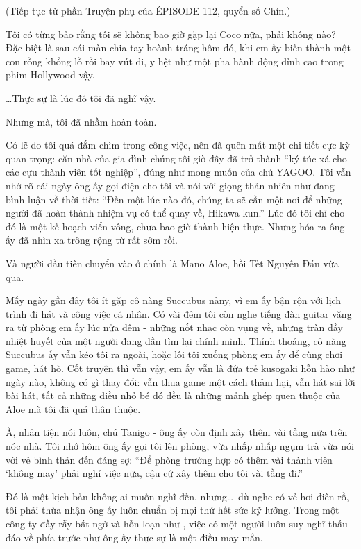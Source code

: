 \documentclass[../main.tex]{subfiles}
\begin{document}
\begin{center}
  (Tiếp tục từ phần {\abv Truyện phụ} của {\flaregothic ÉPISODE 112}, quyển số Chín.)
\end{center}


Tôi có từng bảo rằng tôi sẽ không bao giờ gặp lại Coco nữa, phải không nào? Đặc biệt là sau cái màn chia tay hoành tráng hôm đó, khi em ấy biến thành một con rồng khổng lồ rồi bay vút đi, y hệt như một pha hành động đỉnh cao trong phim Hollywood vậy.

\dots Thực sự là lúc đó tôi đã nghĩ vậy.

Nhưng mà, tôi đã nhầm hoàn toàn.

Có lẽ do tôi quá đắm chìm trong công việc, nên đã quên mất một chi tiết cực kỳ quan trọng: căn nhà của gia đình chúng tôi giờ đây đã trở thành ``ký túc xá cho các cựu thành viên tốt nghiệp'', đúng như mong muốn của chú YAGOO. Tôi vẫn nhớ rõ cái ngày ông ấy gọi điện cho tôi và nói với giọng thản nhiên như đang bình luận về thời tiết: ``Đến một lúc nào đó, chúng ta sẽ cần một nơi để những người đã hoàn thành nhiệm vụ có thể quay về, Hikawa-kun.'' Lúc đó tôi chỉ cho đó là một kế hoạch viển vông, chưa bao giờ thành hiện thực. Nhưng hóa ra ông ấy đã nhìn xa trông rộng từ rất sớm rồi.

Và người đầu tiên chuyển vào ở chính là Mano Aloe, hồi Tết Nguyên Đán vừa qua.

Mấy ngày gần đây tôi ít gặp cô nàng Succubus nàny, vì em ấy bận rộn với lịch trình đi hát và công việc cá nhân. Có vài đêm tôi còn nghe tiếng đàn guitar văng ra từ phòng em ấy lúc nửa đêm - những nốt nhạc còn vụng về, nhưng tràn đầy nhiệt huyết của một người đang dần tìm lại chính mình. Thỉnh thoảng, cô nàng Succubus ấy vẫn kéo tôi ra ngoài, hoặc lôi tôi xuống phòng em ấy để cùng chơi game, hát hò. Cốt truyện thì vẫn vậy, em ấy vẫn là đứa trẻ kusogaki hỗn hào như ngày nào, không có gì thay đổi: vẫn thua game một cách thảm hại, vẫn hát sai lời bài hát, tất cả những điều nhỏ bé đó đều là những mảnh ghép quen thuộc của Aloe mà tôi đã quá thân thuộc.

À, nhân tiện nói luôn, chú Tanigo - ông ấy còn định xây thêm vài tầng nữa trên nóc nhà. Tôi nhớ hôm ông ấy gọi tôi lên phòng, vừa nhấp nhấp ngụm trà vừa nói với vẻ bình thản đến đáng sợ: ``Để phòng trường hợp có thêm vài thành viên `không may' phải nghỉ việc nữa, cậu cứ xây thêm cho tôi vài tầng đi.''

Đó là một kịch bản không ai muốn nghĩ đến, nhưng\dots\ dù nghe có vẻ hơi điên rồ, tôi phải thừa nhận ông ấy luôn chuẩn bị mọi thứ hết sức kỹ lưỡng. Trong một công ty đầy rẫy bất ngờ và hỗn loạn như \hll, việc có một người luôn suy nghĩ thấu đáo về phía trước như ông ấy thực sự là một điều may mắn.
\end{document}
